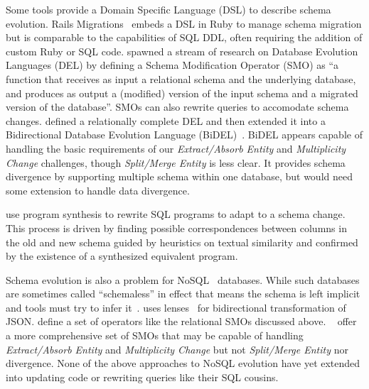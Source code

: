 \documentclass[english,submission]{programming}
\begin{document}
Some tools provide a Domain Specific Language (DSL) to describe schema evolution. Rails Migrations~\cite{RailsMigrations} embeds a DSL in Ruby to manage schema migration but is comparable to the capabilities of SQL DDL, often requiring the addition of custom Ruby or SQL code. \citet{curino08} spawned a stream of research on Database Evolution Languages (DEL) by defining a Schema Modification Operator (SMO) as ``a function that receives as input a relational schema and the underlying database, and produces as output a (modified) version of the input schema and a migrated version of the database''. SMOs can also rewrite queries to accomodate schema changes. \citet{herrmann15} defined a relationally complete DEL and then extended it into a Bidirectional Database Evolution Language (BiDEL)~\cite{herrmann17}. BiDEL appears capable of handling the basic requirements of our \textit{Extract/Absorb Entity} and \textit{Multiplicity Change} challenges, though \textit{Split/Merge Entity} is less clear. It provides schema divergence by supporting multiple schema within one database, but would need some extension to handle data divergence.

\citet{wang19} use program synthesis to rewrite SQL programs to adapt to a schema change. This process is driven by finding possible correspondences between columns in the old and new schema guided by heuristics on textual similarity and confirmed by the existence of a synthesized equivalent program.

Schema evolution is also a problem for NoSQL~\cite{sadalage12} databases. While such databases are sometimes called ``schemaless'' in effect that means the schema is left implicit and tools must try to infer it~\cite{storl20, storl22}. \citet{Cambria} uses lenses~\cite{Foster2007} for bidirectional transformation of JSON. \citet{scherzinger13} define a set of operators like the relational SMOs discussed above. \citeauthor*{chillon21}~\cite{chillon21, chillon22} offer a more comprehensive set of SMOs that may be capable of handling \textit{Extract/Absorb Entity} and \textit{Multiplicity Change} but not \textit{Split/Merge Entity} nor divergence. None of the above approaches to NoSQL evolution have yet extended into updating code or rewriting queries like their SQL cousins.
\end{document}
